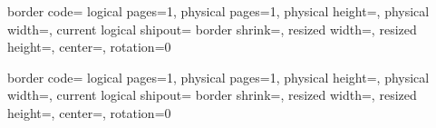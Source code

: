{%
  \edef\pgfpageoptionheight{\the\paperheight}
  \edef\pgfpageoptionwidth{\the\paperwidth}
  \def\pgfpageoptionborder{0pt}
  \def\pgfpageoptionfirstshipout{1}
  \def\pgfpageoptionbordercode{}
}%
{%
  \pgfpagessetdefaults
  {%
    border code=\pgfpageoptionbordercode
  }
  \pgfpagesphysicalpageoptions
  {%
    logical pages=1,%
    physical pages=1,%
    physical height=\pgfpageoptionheight,%
    physical width=\pgfpageoptionwidth,%
    current logical shipout=\pgfpageoptionfirstshipout%
  }
    {%
      border shrink=\pgfpageoptionborder,%
      resized width=\pgfphysicalwidth,%
      resized height=\pgfphysicalheight,%
      center=\pgfpoint{.5\pgfphysicalwidth}{.5\pgfphysicalheight},%
      rotation=0
    }%
}

{%
  \edef\pgfpageoptionheight{\the\paperheight}
  \edef\pgfpageoptionwidth{\the\paperwidth}
  \def\pgfpageoptionborder{0pt}
  \def\pgfpageoptionfirstshipout{1}
  \def\pgfpageoptionbordercode{}
}%
{%
  \pgfpagessetdefaults
  {%
    border code=\pgfpageoptionbordercode
  }
  \pgfpagesphysicalpageoptions
  {%
    logical pages=1,%
    physical pages=1,%
    physical height=\pgfpageoptionheight,%
    physical width=\pgfpageoptionwidth,%
    current logical shipout=\pgfpageoptionfirstshipout%
  }
    {%
      border shrink=\pgfpageoptionborder,%
      resized width=\pgfphysicalwidth,%
      resized height=\pgfphysicalheight,%
      center=\pgfpoint{.5\pgfphysicalwidth}{.5\pgfphysicalheight},%
      rotation=0
    }%
}

